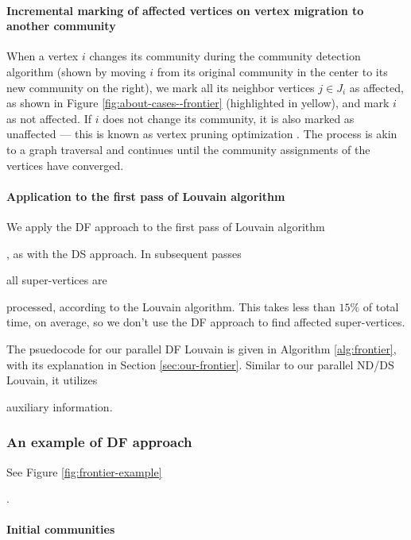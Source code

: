 \paragraph{Incremental marking of affected vertices on vertex migration to another community}

When a vertex $i$ changes its community during the community detection algorithm (shown by moving $i$ from its original community in the center to its new community on the right), we mark all its neighbor vertices $j \in J_i$ as affected, as shown in Figure \ref{fig:about-cases--frontier} (highlighted in yellow), and mark $i$ as not affected. If $i$ does not change its community, it is also marked as unaffected --- this is known as vertex pruning optimization \cite{com-ozaki16, com-ryu16, com-shi21, com-zhang21}. The process is akin to a graph traversal and continues until the community assignments of the vertices have converged.

\paragraph{Application to the first pass of Louvain algorithm}

We apply the DF approach to the first pass of Louvain algorithm, as with the DS approach. In subsequent passes all super-vertices are processed, according to the Louvain algorithm. This takes less than $15\%$ of total time, on average, so we don't use the DF approach to find affected super-vertices. The psuedocode for our parallel DF Louvain is given in Algorithm \ref{alg:frontier}, with its explanation in Section \ref{sec:our-frontier}. Similar to our parallel ND/DS Louvain, it utilizes auxiliary information.


\subsubsection{An example of DF approach}

See Figure \ref{fig:frontier-example}.

\paragraph{Initial communities}

